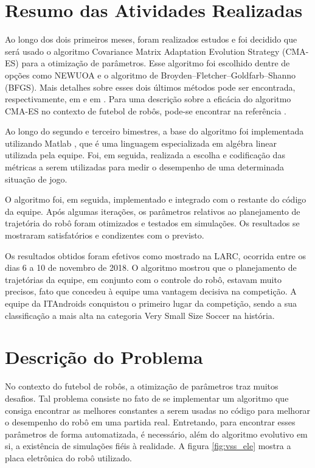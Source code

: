 \documentclass[a4paper,12pt]{article}
\begin{document}
\section{Resumo das Atividades Realizadas}
\label{secao:atividades_realizadas}

Ao longo dos dois primeiros meses, foram realizados estudos e foi decidido que será usado o algoritmo Covariance Matrix Adaptation Evolution Strategy (CMA-ES) para a otimização de parâmetros. Esse algoritmo foi escolhido dentre de opções como NEWUOA e o algoritmo de Broyden–Fletcher–Goldfarb–Shanno (BFGS). Mais detalhes sobre esses dois últimos métodos pode ser encontrada, respectivamente, em \cite{NEWUOA} e em \cite{BFGS}. Para uma descrição sobre a eficácia do algoritmo CMA-ES no contexto de futebol de robôs, pode-se encontrar na referência \cite{CMA-ES-Soccer}.

Ao longo do segundo e terceiro bimestres, a base do algoritmo foi implementada utilizando Matlab \cite{matlab}, que é uma linguagem especializada em algébra linear utilizada pela equipe. Foi, em seguida, realizada a escolha e codificação das métricas a serem utilizadas para medir o desempenho de uma determinada situação de jogo.

O algoritmo foi, em seguida, implementado e integrado com o restante do código da equipe. Após algumas iterações, os parâmetros relativos ao planejamento de trajetória do robô foram otimizados e testados em simulações. Os resultados se mostraram satisfatórios e condizentes com o previsto.

Os resultados obtidos foram efetivos como mostrado na LARC, ocorrida entre os dias 6 a 10 de novembro de 2018. O algoritmo mostrou que o planejamento de trajetórias da equipe, em conjunto com o controle do robô, estavam muito precisos, fato que concedeu à equipe uma vantagem decisiva na competição. A equipe da ITAndroids conquistou o primeiro lugar da competição, sendo a sua classificação a mais alta  na categoria Very Small Size Soccer na história.

\section{Descrição do Problema}
\label{secao:enunciado_problema}

No contexto do futebol de robôs, a otimização de parâmetros traz muitos desafios. Tal problema consiste no fato de se implementar um algoritmo que consiga encontrar as melhores constantes a serem usadas no código para melhorar o desempenho do robô em uma partida real. Entretando, para encontrar esses parâmetros de forma automatizada, é necessário, além do algoritmo evolutivo em si, a existência de simulações fiéis à realidade. A figura \ref{fig:vss_ele} mostra a placa eletrônica do robô utilizado.
\end{document}
